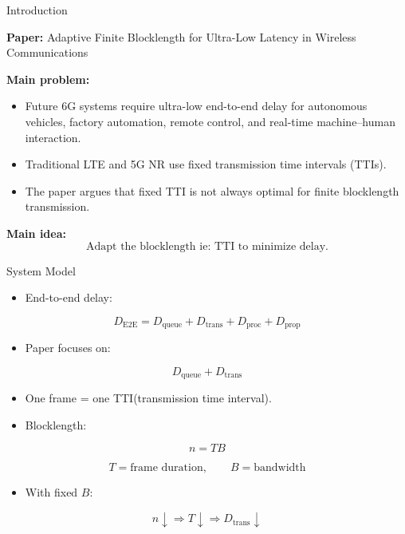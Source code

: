 \documentclass{beamer}
\begin{document}
\begin{frame}{Introduction}
\small

\textbf{Paper:} Adaptive Finite Blocklength for Ultra-Low Latency in Wireless Communications

\vspace{0.2cm}

\textbf{Main problem:}
\begin{itemize}
    \item Future 6G systems require ultra-low end-to-end delay for autonomous vehicles, factory automation, remote control, and real-time machine--human interaction.
    \item Traditional LTE and 5G NR use fixed transmission time intervals (TTIs).
    \item The paper argues that fixed TTI is not always optimal for finite blocklength transmission.
\end{itemize}

\vspace{0.2cm}

\textbf{Main idea:}
\[
\text{Adapt the blocklength ie:  TTI to minimize delay.}
\]

\end{frame}

\begin{frame}{System Model}
\small

\begin{itemize}
    \item End-to-end delay:
\end{itemize}

\[
D_{\text{E2E}}
=
D_{\text{queue}}
+
D_{\text{trans}}
+
D_{\text{proc}}
+
D_{\text{prop}}
\]

\begin{itemize}
    \item Paper focuses on:
\end{itemize}

\[
D_{\text{queue}} + D_{\text{trans}}
\]

\begin{itemize}
    \item One frame = one TTI(transmission time interval).
    \item Blocklength:
\end{itemize}

\[
n = TB
\]

\[
T = \text{frame duration},
\qquad
B = \text{bandwidth}
\]

\begin{itemize}
    \item With fixed $B$:
\end{itemize}

\[
n \downarrow
\Rightarrow
T \downarrow
\Rightarrow
D_{\text{trans}} \downarrow
\]

\end{frame}
\end{document}
